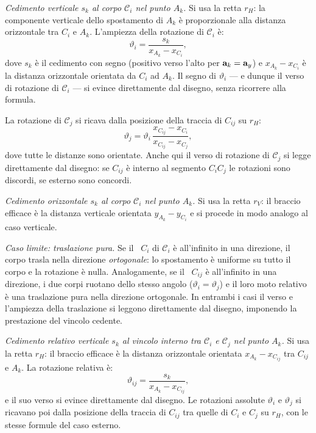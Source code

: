\smallskip
\noindent\textit{Cedimento verticale $s_k$ al corpo
	$\mathcal{C}_i$ nel punto $A_k$.}
Si usa la retta $r_H$: la componente verticale dello
spostamento di $A_k$ è proporzionale alla distanza
orizzontale tra $C_i$ e $A_k$. L'ampiezza della rotazione
di $\mathcal{C}_i$ è:
\begin{equation}
	\vartheta_i =
	\frac{s_k}{x_{A_k} - x_{C_i}},
\end{equation}
dove $s_k$ è il cedimento con segno (positivo verso l'alto
per $\mathbf{a}_k = \mathbf{a}_y$) e $x_{A_k} - x_{C_i}$ è la distanza
orizzontale orientata da $C_i$ ad $A_k$. Il segno di
$\vartheta_i$ --- e dunque il verso di rotazione di
$\mathcal{C}_i$ --- si evince direttamente dal disegno,
senza ricorrere alla formula.

La rotazione di $\mathcal{C}_j$ si ricava dalla posizione
della traccia di $C_{ij}$ su $r_H$:
\begin{equation}
	\vartheta_j = \vartheta_i\,
	\frac{x_{C_{ij}} - x_{C_i}}
	{x_{C_{ij}} - x_{C_j}},
\end{equation}
dove tutte le distanze sono orientate. Anche qui il verso
di rotazione di $\mathcal{C}_j$ si legge direttamente dal
disegno: se $C_{ij}$ è interno al segmento $C_i C_j$ le
rotazioni sono discordi, se esterno sono concordi.

\smallskip
\noindent\textit{Cedimento orizzontale $s_k$ al corpo
	$\mathcal{C}_i$ nel punto $A_k$.}
Si usa la retta $r_V$: il braccio efficace è la distanza
verticale orientata $y_{A_k} - y_{C_i}$ e si procede in
modo analogo al caso verticale.


\smallskip
\noindent\textit{Caso limite: traslazione pura.}
Se il \CRa\ $C_i$ di $\mathcal{C}_i$ è all'infinito in una
direzione, il corpo trasla nella direzione \emph{ortogonale}:
lo spostamento è uniforme su tutto il corpo e la rotazione è
nulla. Analogamente, se il \CRr\ $C_{ij}$ è all'infinito in
una direzione, i due corpi ruotano dello stesso angolo
($\vartheta_i = \vartheta_j$) e il loro moto relativo è una
traslazione pura nella direzione ortogonale. In entrambi i
casi il verso e l'ampiezza della traslazione si leggono
direttamente dal disegno, imponendo la prestazione del
vincolo cedente.


\smallskip
\noindent\textit{Cedimento relativo verticale $s_k$ al vincolo
	interno tra $\mathcal{C}_i$ e $\mathcal{C}_j$ nel punto $A_k$.}
Si usa la retta $r_H$: il braccio efficace è la distanza
orizzontale orientata $x_{A_k} - x_{C_{ij}}$ tra $C_{ij}$
e $A_k$. La rotazione relativa è:
\begin{equation}
	\vartheta_{ij} =
	\frac{s_k}{x_{A_k} - x_{C_{ij}}},
\end{equation}
e il suo verso si evince direttamente dal disegno. Le
rotazioni assolute $\vartheta_i$ e $\vartheta_j$ si ricavano
poi dalla posizione della traccia di $C_{ij}$ tra quelle di
$C_i$ e $C_j$ su $r_H$, con le stesse formule del caso
esterno.

